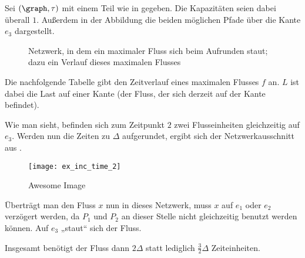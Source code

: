 \begin{example}
    Sei $(\graph, \tau)$ mit einem Teil wie in  gegeben.
    Die Kapazitäten seien dabei überall $1$. Außerdem in der Abbildung die
    beiden möglichen Pfade über die Kante $e_3$ dargestellt.

    \newsavebox{\tempbox}
    \begin{figure}[H]
    \subfloat{\usebox{\tempbox}}%
    \qquad
      \caption{Netzwerk, in dem ein maximaler Fluss sich beim Aufrunden staut;
        dazu ein Verlauf dieses maximalen Flusses}\label{fig:ex_inc_time_1}
    \end{figure}

    Die nachfolgende Tabelle gibt den Zeitverlauf eines maximalen Flusses
    $f$ an. $L$ ist dabei die Last auf einer Kante (der Fluss, der sich
    derzeit auf der Kante befindet).

    Wie man sieht, befinden sich zum Zeitpunkt $2$ zwei Flusseinheiten gleichzeitig
    auf $e_3$. Werden nun die Zeiten zu $\Delta$ aufgerundet, ergibt sich der
    Netzwerkausschnitt aus .

    \begin{figure}[H]
    \centering
    \texttt{[image: ex\_inc\_time\_2]}
    \caption{Awesome Image}
    \label{fig:ex_inc_time_2}
    \end{figure}

     Überträgt man den Fluss $x$ nun
    in dieses Netzwerk, muss $x$ auf $e_1$ oder $e_2$ verzögert werden, da $P_1$
    und $P_2$ an dieser Stelle nicht gleichzeitig benutzt werden können.
    Auf $e_3$ „staut“ sich der Fluss.

    Insgesamt benötigt der Fluss dann $2\Delta$ statt lediglich $\frac{3}{2}\Delta$
    Zeiteinheiten.
\end{example}

